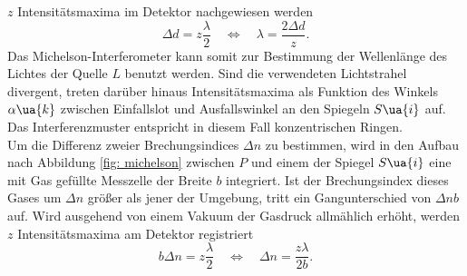 $z$ Intensitätsmaxima im Detektor nachgewiesen werden
\begin{equation}
  \Delta d = z\frac{\lambda}{2} \quad \Leftrightarrow \quad \lambda = \frac{2 \Delta d}{z}.
  \label{eq: maxima_wellenlänge}
\end{equation}
Das Michelson-Interferometer kann somit zur Bestimmung der Wellenlänge des Lichtes der Quelle $L$ benutzt werden. Sind die verwendeten
Lichtstrahel divergent, treten darüber hinaus Intensitätsmaxima als Funktion des Winkels $\alpha\ua{k}$ zwischen Einfallslot und Ausfallswinkel an den Spiegeln $S\ua{i}$
auf. Das Interferenzmuster entspricht in diesem Fall konzentrischen Ringen.\\
Um die Differenz zweier Brechungsindices $\Delta n$ zu bestimmen, wird in den Aufbau nach Abbildung \ref{fig: michelson} zwischen $P$ und einem der Spiegel $S\ua{i}$ eine
mit Gas gefüllte Messzelle der Breite $b$ integriert. Ist der Brechungsindex dieses Gases um $\Delta n$ größer als jener der Umgebung,
tritt ein Gangunterschied von $\Delta n b$ auf. Wird ausgehend von einem Vakuum der Gasdruck allmählich erhöht, werden $z$ Intensitätsmaxima am Detektor
registriert
\begin{equation}
  b \Delta n = z\frac{\lambda}{2} \quad \Leftrightarrow \quad \Delta n = \frac{z \lambda}{2b}.
  \label{eq: maxima_brechungsindex}
\end{equation}
